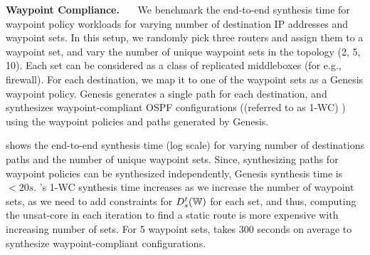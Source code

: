 \noindent\textbf{Waypoint Compliance.}~~~
We benchmark the end-to-end synthesis time for waypoint policy 
workloads for varying number of destination IP addresses and 
waypoint sets. In this setup, we randomly pick three routers
and assign them to a waypoint set, and vary the number of 
unique waypoint sets in the topology (2, 5, 10). Each set can be 
considered as a class of replicated middleboxes (for e.g., firewall).
For each destination, we map it to one of the waypoint sets as a
Genesis waypoint policy. Genesis generates a single path for each 
destination, and \name synthesizes waypoint-compliant OSPF 
configurations ((referred to as 1-WC) ) 
using the waypoint policies and paths generated by Genesis.  

 shows the end-to-end synthesis
 time (log scale) for varying number of destinations paths and the 
 number of unique waypoint sets. Since, synthesizing paths
 for waypoint policies can be synthesized independently,
Genesis synthesis time is $<20s$. \name's 1-WC synthesis 
time increases as we increase the number of waypoint sets,
as we need to add constraints for $D_s^t(\mathbb{W})$ 
for each set, and thus, computing the unsat-core in each
iteration to find a static route is more expensive with increasing
number of sets. For 5 waypoint sets, \name takes 300 
seconds on average to synthesize waypoint-compliant configurations. 




